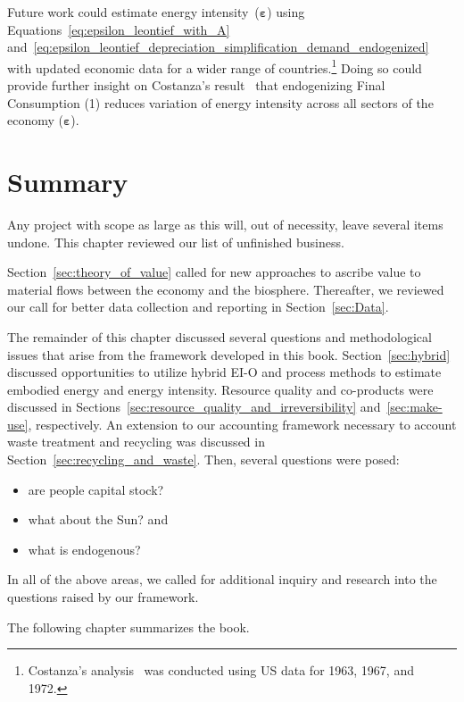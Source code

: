 Future work could estimate energy intensity~($\boldsymbol{\varepsilon}$) 
using Equations~\ref{eq:epsilon_leontief_with_A}
and~\ref{eq:epsilon_leontief_depreciation_simplification_demand_endogenized}
with updated economic data for a wider range of countries.\footnote{Costanza's
analysis~\cite{Costanza:1980ww} was conducted using US data for 1963, 1967, and 1972.}
Doing so could provide further insight on Costanza's result~\cite{Costanza:1980ww}
that endogenizing Final Consumption (1) reduces variation 
of energy intensity across all sectors of the economy ($\boldsymbol{\varepsilon}$).


\section{Summary}
\label{sec:unfinished_summary}

Any project with scope as large as this will, out of necessity, leave
several items undone.
This chapter reviewed our list of unfinished business.

Section~\ref{sec:theory_of_value} called for new approaches
to ascribe value to material flows between the economy and the biosphere.
Thereafter, we reviewed our call for better data collection and reporting
in Section~\ref{sec:Data}.

The remainder of this chapter discussed several questions
and methodological issues that arise from the framework
developed in this book.
Section~\ref{sec:hybrid} discussed opportunities to utilize hybrid EI-O and process methods
to estimate embodied energy and energy intensity.
Resource quality and co-products were discussed 
in Sections~\ref{sec:resource_quality_and_irreversibility}
and~\ref{sec:make-use}, respectively.
An extension to our accounting framework necessary to account
waste treatment and recycling was discussed in Section~\ref{sec:recycling_and_waste}.
Then, several questions were posed:
%
\begin{itemize}
	\item{are people capital stock?}
	
	\item{what about the Sun? and}
	
	\item{what is endogenous?}
\end{itemize}
%
In all of the above areas, we called for additional 
inquiry and research 
into the questions raised by our framework.

The following chapter summarizes the book. 


